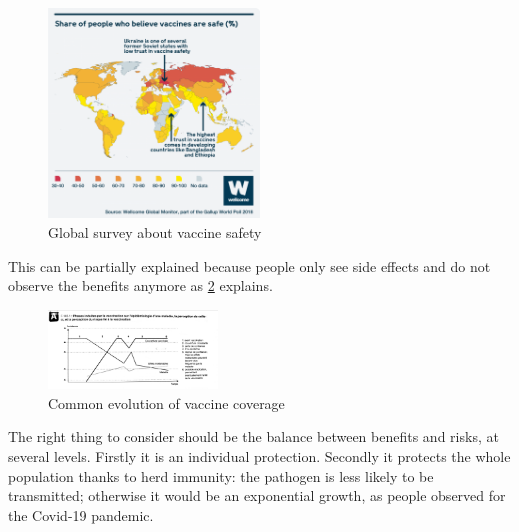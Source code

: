 \documentclass{article}
\begin{document}
                \begin{figure}
                    \centering
                    \includegraphics[width=0.5\textwidth]{imgs/VaccineHesitancy.png}
                    \caption{Global survey about vaccine safety \autocite{SurveyRevealsEuropean}}
                    \label{fig:survey}
                \end{figure}

            This can be partially explained because people only see side effects and do not observe the benefits anymore as \ref{fig:perception} explains.
        
            \begin{figure}
                    \centering
                \includegraphics[width=0.4\textwidth, angle=90]{imgs/Perception.jpg} %
                    \caption{Common evolution of vaccine coverage \autocite{PILLYEtudiantMaladies}}
                \label{fig:perception}
            \end{figure}
            
            The right thing to consider should be the balance between benefits and risks, at several levels.
            Firstly it is an individual protection. 
            Secondly it protects the whole population thanks to herd immunity: the pathogen is less likely to be transmitted; otherwise it would be 
                an exponential growth,
                as people observed for the Covid-19 pandemic.
        
\end{document}
